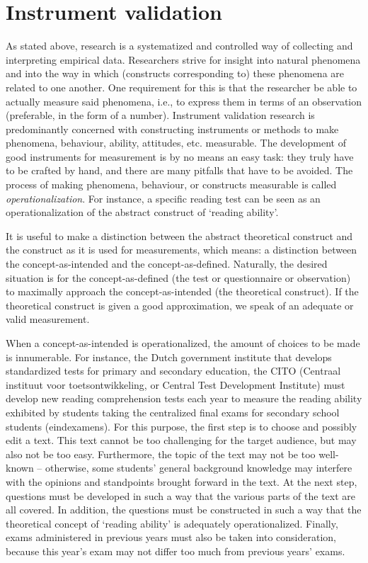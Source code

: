 \documentclass[
]{book}
\begin{document}
\hypertarget{sec:instrument-validation}{%
\section{Instrument validation}\label{sec:instrument-validation}}

As stated above, research is a systematized and controlled way of collecting and interpreting empirical data. Researchers strive for insight into natural phenomena and into the way in which (constructs corresponding to) these phenomena are related to one another. One requirement for this is that the researcher be able to actually measure said phenomena, i.e., to express them in terms of an observation (preferable, in the form of a number). Instrument validation research is predominantly concerned with constructing instruments or methods to make phenomena, behaviour, ability, attitudes, etc. measurable. The development of good instruments for measurement is by no means an easy task: they truly have to be crafted by hand, and there are many pitfalls that have to be avoided. The process of making phenomena, behaviour, or constructs measurable is called \emph{operationalization}. For instance, a specific reading test can be seen as an operationalization of the abstract construct of `reading ability'.

It is useful to make a distinction between the abstract theoretical construct and the construct as it is used for measurements, which means: a distinction between the concept-as-intended and the concept-as-defined. Naturally, the desired situation is for the concept-as-defined (the test or questionnaire or observation) to maximally approach the concept-as-intended (the theoretical construct). If the theoretical construct is given a good approximation, we speak of an adequate or valid measurement.

When a concept-as-intended is operationalized, the amount of choices to be made is innumerable. For instance, the Dutch government institute that develops standardized tests for primary and secondary education, the CITO (Centraal instituut voor toetsontwikkeling, or Central Test Development Institute) must develop new reading comprehension tests each year to measure the reading ability exhibited by students taking the centralized final exams for secondary school students (eindexamens). For this purpose, the first step is to choose and possibly edit a text. This text cannot be too challenging for the target audience, but may also not be too easy. Furthermore, the topic of the text may not be too well-known -- otherwise, some students' general background knowledge may interfere with the opinions and standpoints brought forward in the text. At the next step, questions must be developed in such a way that the various parts of the text are all covered. In addition, the questions must be constructed in such a way that the theoretical concept of `reading ability' is adequately operationalized. Finally, exams administered in previous years must also be taken into consideration, because this year's exam may not differ too much from previous years' exams.
\end{document}
